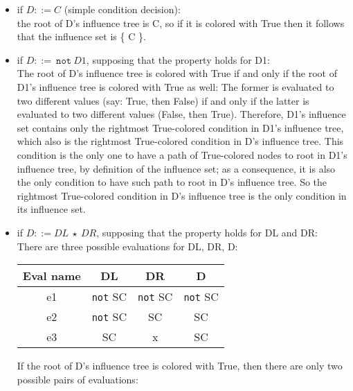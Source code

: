 \documentclass[a4paper,12pt,twoside]{article}
\newcommand{\anysc}{\star}
\newcommand{\adanot}{\texttt{not}}
\begin{document}
\begin{itemize}

\item if $D ::= C$ (simple condition decision):\\
  the root of D's influence tree is C, so if it is colored with True then
  it follows that the influence set is \{ C \}.

\item if $D ::=\ \adanot{} \ D1$, supposing that the property holds for D1:\\
  The root of D's influence tree is colored with True if and only if
  the root of D1's influence tree is colored with True as well: The
  former is evaluated to two different values (say: True, then False)
  if and only if the latter is evaluated to two different values
  (False, then True). Therefore, D1's influence set contains only the
  rightmost True-colored condition in D1's influence tree, which also
  is the rightmost True-colored condition in D's influence tree.  This
  condition is the only one to have a path of True-colored nodes to
  root in D1's influence tree, by definition of the influence set; as
  a consequence, it is also the only condition to have such path to
  root in D's influence tree. So the rightmost True-colored condition
  in D's influence tree is the only condition in its influence set.

\item if $D ::= DL \ \anysc{} \ DR$, supposing that the property holds
  for DL and DR:\\
  There are three possible evaluations for DL, DR, D:

\begin{center}
\begin{tabular}{|c|c|c||c|}
\hline
Eval name & DL            & DR            & D                    \\ \hline
e1        & \adanot{} SC  & \adanot{} SC  & \adanot{} SC         \\ \hline
e2        & \adanot{} SC  & SC            & SC                   \\ \hline
e3        & SC            & x             & SC                   \\ \hline
\end{tabular}
\end{center}

If the root of D's influence tree is colored with True, then there are only
two possible pairs of evaluations:


\end{itemize}
\end{document}
